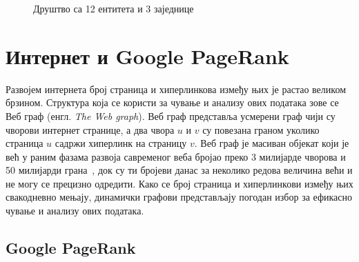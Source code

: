 \begin{figure}[ht]
\centering
\begingroup
{}
\endgroup
\caption{Друштво са 12 ентитета и 3 заједнице}
\label{fig:community_graph}
\end{figure}

\section{Интернет и Google PageRank}

Развојем интернета број страница и хиперлинкова између њих је растао великом брзином. Структура која се користи за чување и анализу ових података зове се Веб граф (енгл. \textit{The Web graph}). Веб граф представља усмерени граф чији су чворови интернет странице, а два чвора $u$ и $v$ су повезана граном уколико страница $u$ садржи хиперлинк на страницу $v$. Веб граф је масиван објекат који је већ у раним фазама развоја савременог веба бројао преко 3 милијарде чворова и 50 милијарди грана~\cite{boldiWebgraphFrameworkCompression2004}, док су ти бројеви данас за неколико редова величина већи и не могу се прецизно одредити. Како се број страница и хиперлинкови између њих свакодневно мењају, динамички графови представљају погодан избор за ефикасно чување и анализу ових података. 

\subsection{Google PageRank}

